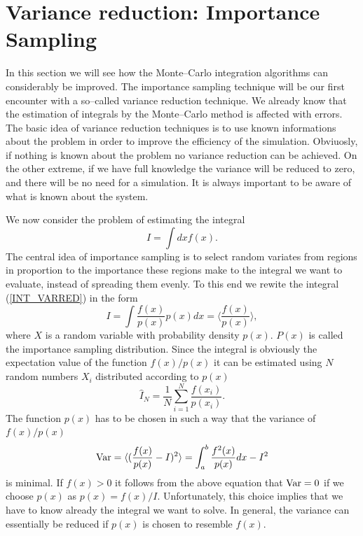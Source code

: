 
\section{Variance reduction: Importance Sampling}
In this section we will see how the Monte--Carlo integration
algorithms can considerably be improved. The importance sampling 
technique will be our first encounter with a so--called variance 
reduction technique. We already know that the estimation of 
integrals by the Monte--Carlo method is affected with errors. The
basic idea of variance reduction techniques is to use known 
informations about the problem in order to improve the efficiency 
of the simulation. Obviuosly, if nothing is known about the 
problem no variance reduction can be achieved. On the other 
extreme, if we have full knowledge the variance will be reduced to 
zero, and there will be no need for a simulation. It is always 
important to be aware of what is known about the system.

We now consider the problem of estimating the integral
\begin{equation}
\label{INT_VARRED}
I = \int dx f(x).
\end{equation}
The central idea of importance sampling is to select random 
variates from regions in proportion to the importance these 
regions make to the integral we want to evaluate, instead of 
spreading them evenly. To this end we rewite the integral 
(\ref{INT_VARRED}) in the form
\begin{equation*}
I = \int \frac{f(x)}{p(x)} p(x) dx = \langle 
\frac{f(x)}{p(x)}\rangle,
\end{equation*}
where $X$ is a random variable with probability density $p(x)$.
$P(x)$ is called the importance sampling distribution.  Since the
integral is obviously the expectation value of the function $f(x)/p(x)$
it can be estimated using $N$ random numbers $X_i$ distributed 
according to $p(x)$
\begin{equation*}
\hat{I}_N = \frac{1}{N} \sum_{i=1}^N \frac{f(x_i)}{p(x_i)}.
\end{equation*}
The function $p(x)$ has to be chosen in such a way that the 
variance of $f(x)/p(x)$ 
\begin{equation*}
{\rm Var} = \langle (\frac{f(x)}{p(x)}-I)^2\rangle
   = \int_a^b \frac{f^2(x)}{p(x)}dx - I^2
\end{equation*}
is minimal. If $f(x)>0$ it follows from the above equation that
${\rm Var}=0$ if we choose $p(x)$ as $p(x) = f(x)/I$. 
Unfortunately, this choice implies that we have to know already 
the integral we want to solve. In general, the variance can 
essentially be reduced if $p(x)$ is chosen to resemble $f(x)$.

